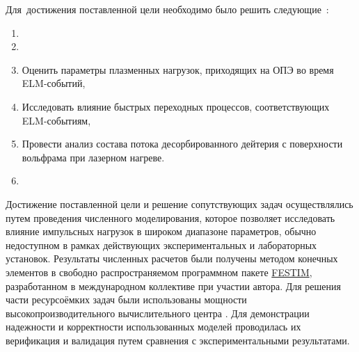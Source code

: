 Для~достижения поставленной цели необходимо было решить следующие~{\tasks}:
\begin{enumerate}[beginpenalty=10000] %
    \item {}
    \item {}
    \item Оценить параметры плазменных нагрузок, приходящих на ОПЭ во время ELM-событий, 
    \item Исследовать влияние быстрых переходных процессов, соответствующих ELM-событиям, 
    \item Провести анализ состава потока десорбированного дейтерия с поверхности вольфрама при лазерном нагреве.
    \item {}
\end{enumerate}

{\methods} Достижение поставленной цели и решение сопутствующих задач осуществлялись путем проведения численного моделирования, которое позволяет исследовать влияние импульсных нагрузок в широком диапазоне параметров, обычно недоступном в рамках действующих экспериментальных и лабораторных установок. Результаты численных расчетов были получены методом конечных элементов в свободно распространяемом программном пакете \href{https://github.com/festim-dev/FESTIM}{FESTIM}, разработанном в международном коллективе при участии автора. Для решения части ресурсоёмких задач были использованы мощности высокопроизводительного вычислительного центра \thesisOrganizationShort. Для демонстрации надежности и корректности использованных моделей проводилась их верификация и валидация путем сравнения с экспериментальными результатами.

